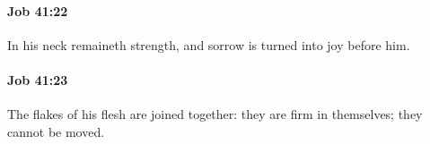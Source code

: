 		\paragraph{Job 41:22} %
			\label{JOB-41-22}

			In his neck remaineth strength, and sorrow is turned into joy before him.


		\paragraph{Job 41:23} %
			\label{JOB-41-23}

			The flakes of his flesh are joined together: they are firm in themselves; they cannot be moved.


